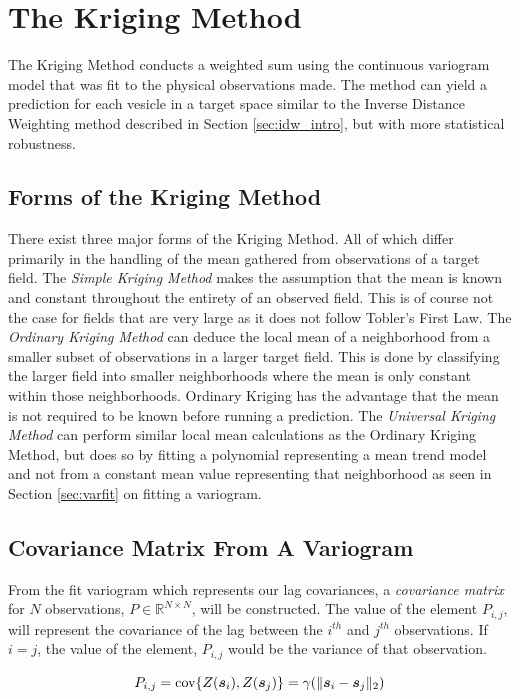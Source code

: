 \section{The Kriging Method}
The Kriging Method conducts a weighted sum using the continuous variogram model that was fit to the physical observations made. The method can yield a prediction for each vesicle in a target space similar to the Inverse Distance Weighting method described in Section \ref{sec:idw_intro}, but with more statistical robustness.

\subsection{Forms of the Kriging Method}
There exist three major forms of the Kriging Method. All of which differ primarily in the handling of the mean gathered from observations of a target field. The \textit{Simple Kriging Method} makes the assumption that the mean is known and constant throughout the entirety of an observed field. This is of course not the case for fields that are very large as it does not follow Tobler's First Law. The \textit{Ordinary Kriging Method} can deduce the local mean of a neighborhood from a smaller subset of observations in a larger target field. This is done by classifying the larger field into smaller neighborhoods where the mean is only constant within those neighborhoods. Ordinary Kriging has the advantage that the mean is not required to be known before running a prediction. The \textit{Universal Kriging Method} can perform similar local mean calculations as the Ordinary Kriging Method, but does so by fitting a polynomial representing a mean trend model and not from a constant mean value representing that neighborhood \cite{vandergraaf:nnkrig} as seen in Section \ref{sec:varfit} on fitting a variogram.

\subsection{Covariance Matrix From A Variogram} \label{sec:covmat}
From the fit variogram which represents our lag covariances, a \textit{covariance matrix} for $N$ observations, $P \in \mathbb{R}^{N \times N}$, will be constructed. The value of the element $P_{i,j}$, will represent the covariance of the lag between the $i^{th}$ and $j^{th}$ observations. If $i=j$, the value of the element, $P_{i,j}$ would be the variance of that observation. 

\begin{equation}
    P_{i,j} = \text{cov}\{Z({\it{\boldsymbol{s}}}_{i}), Z({\it{\boldsymbol{s}}}_{j})\} = \gamma(\| {\it{\boldsymbol{s}}}_i - {\it{\boldsymbol{s}}}_j \|_2)
    \label{eq:covvarmatelem}
\end{equation}

